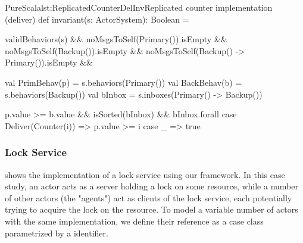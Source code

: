 \begin{Code}{PureScala}{lst:ReplicatedCounterDelInv}{Replicated counter implementation (deliver)}
def invariant(s: ActorSystem): Boolean = {
  validBehaviors(s)                           &&
  noMsgsToSelf(Primary()).isEmpty             &&
  noMsgsToSelf(Backup()).isEmpty              &&
  noMsgsToSelf(Backup() -> Primary()).isEmpty && {
    val PrimBehav(p) = s.behaviors(Primary())
    val BackBehav(b) = s.behaviors(Backup())
    val bInbox       = s.inboxes(Primary() -> Backup())

    p.value >= b.value && isSorted(bInbox) && bInbox.forall {
      case Deliver(Counter(i)) => p.value >= i
      case _                   => true
    }
  }
}
\end{Code}



\subsubsection*{Lock Service}

 shows the implementation of a lock service using our framework. In this case study, an actor acts as a server holding a lock on some resource, while a number of other actors (the "agents") act as clients of the lock service, each potentially trying to acquire the lock on the resource. To model a variable number of actors with the same implementation, we define their reference as a case class parametrized by a  identifier.

